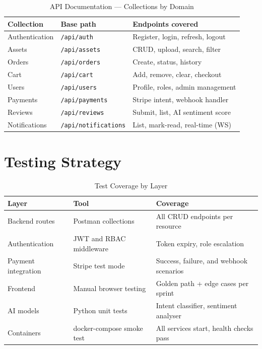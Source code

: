 \begin{table}[H]
\centering
\caption{API Documentation --- Collections by Domain}
\begin{tabular}{L{3.5cm} L{4cm} L{6cm}}
\toprule
\textbf{Collection} & \textbf{Base path} & \textbf{Endpoints covered} \\
\midrule
Authentication & \texttt{/api/auth}          & Register, login, refresh, logout \\
Assets         & \texttt{/api/assets}        & CRUD, upload, search, filter \\
Orders         & \texttt{/api/orders}        & Create, status, history \\
Cart           & \texttt{/api/cart}          & Add, remove, clear, checkout \\
Users          & \texttt{/api/users}         & Profile, roles, admin management \\
Payments       & \texttt{/api/payments}      & Stripe intent, webhook handler \\
Reviews        & \texttt{/api/reviews}       & Submit, list, AI sentiment score \\
Notifications  & \texttt{/api/notifications} & List, mark-read, real-time (WS) \\
\bottomrule
\end{tabular}
\end{table}

\section{Testing Strategy}

\begin{table}[H]
\centering
\caption{Test Coverage by Layer}
\begin{tabular}{L{3.5cm} L{5cm} L{5cm}}
\toprule
\textbf{Layer} & \textbf{Tool} & \textbf{Coverage} \\
\midrule
Backend routes       & Postman collections       & All CRUD endpoints per resource \\
Authentication       & JWT and RBAC middleware   & Token expiry, role escalation \\
Payment integration  & Stripe test mode          & Success, failure, and webhook scenarios \\
Frontend             & Manual browser testing    & Golden path + edge cases per sprint \\
AI models            & Python unit tests         & Intent classifier, sentiment analyser \\
Containers           & docker-compose smoke test & All services start, health checks pass \\
\bottomrule
\end{tabular}
\end{table}

